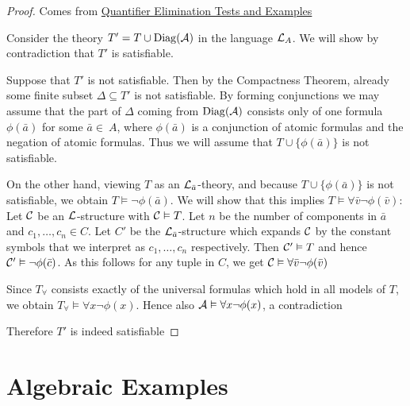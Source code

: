 \documentclass[11pt]{article}
\begin{document}
\begin{proof}
Comes from \href{http://www.math.uni-konstanz.de/\~eleftheriou/teaching/Masterarbeit.pdf}{Quantifier Elimination Tests and Examples}

Consider the theory \(T'=T\cup\operatorname{Diag}(\mathcal{A})\) in the language \(\mathcal{L}_A\). We
will show by contradiction that \(T'\) is satisfiable.

Suppose that \(T'\) is not satisfiable. Then by the Compactness Theorem,
already some finite subset \(\Delta\subseteq T'\) is not satisfiable. By forming
conjunctions we may assume that the part of \(\Delta\) coming from \(\operatorname{Diag}(\mathcal{A})\)
consists only of one formula \(\phi(\bar{a})\) for some \(\bar{a}\in\ A\), where
\(\phi(\bar{a})\) is a conjunction of atomic formulas and the negation of atomic
formulas. Thus we will assume that \(T\cup\{\phi(\bar{a})\}\) is not satisfiable.

On the other hand, viewing \(T\) as an \(\mathcal{L}_{\bar{a}}\)-theory, and because
\(T\cup\{\phi(\bar{a})\}\) is not satisfiable, we obtain
\(T\vDash\neg\phi(\bar{a})\). We will show that this implies
\(T\vDash\forall\bar{v}\neg\phi(\bar{v})\): Let \(\mathcal{C}\) be an
\(\mathcal{L}\)-structure with \(\mathcal{C}\vDash T\). Let \(n\) be the number of
components in \(\bar{a}\) and \(c_1,\dots,c_n\in C\). Let \(C'\) be the
\(\mathcal{L}_{\bar{a}}\)-structure which expands \(\mathcal{C}\) by the constant symbols
that we interpret as \(c_1,\dots,c_n\) respectively. Then \(\mathcal{C}'\vDash T\) and
hence \(\mathcal{C}'\vDash\neg\phi(\bar{c})\). As this follows for any tuple in
\(C\), we get \(\mathcal{C}\vDash\forall\bar{v}\neg\phi(\bar{v})\)

Since \(T_\forall\) consists exactly of the universal formulas which hold in all
models of \(T\), we obtain \(T_\forall\vDash\forall x\neg\phi(x)\). Hence also
\(\mathcal{A}\vDash\forall x\neg\phi(x)\), a contradiction

Therefore \(T'\) is indeed satisfiable
\end{proof}

\section{Algebraic Examples}
\label{sec:org92040e5}
\end{document}
